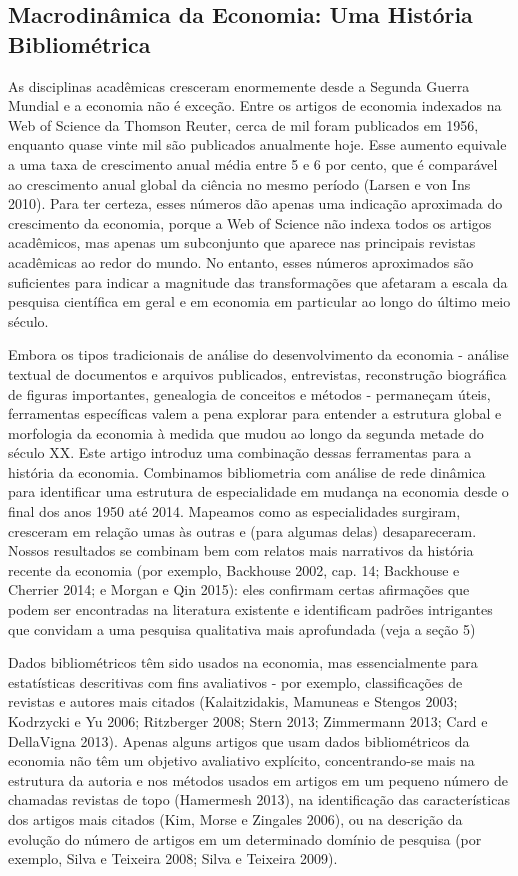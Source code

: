 \documentclass[12pt]{article}
\begin{document}
\subsection{\textbf{Macrodinâmica da Economia: Uma História Bibliométrica}}
As disciplinas acadêmicas cresceram enormemente desde a Segunda Guerra Mundial e a economia não é exceção. Entre os artigos de economia indexados na Web of Science da Thomson Reuter, cerca de mil foram publicados em 1956, enquanto quase vinte mil são publicados anualmente hoje. Esse aumento equivale a uma taxa de crescimento anual média entre 5 e 6 por cento, que é comparável ao crescimento anual global da ciência no mesmo período (Larsen e von Ins 2010). Para ter certeza, esses números dão apenas uma indicação aproximada do crescimento da economia, porque a Web of Science não indexa todos os artigos acadêmicos, mas apenas um subconjunto que aparece nas principais revistas acadêmicas ao redor do mundo. No entanto, esses números aproximados são suficientes para indicar a magnitude das transformações que afetaram a escala da pesquisa científica em geral e em economia em particular ao longo do último meio século.

Embora os tipos tradicionais de análise do desenvolvimento da economia - análise textual de documentos e arquivos publicados, entrevistas, reconstrução biográfica de figuras importantes, genealogia de conceitos e métodos - permaneçam úteis, ferramentas específicas valem a pena explorar para entender a estrutura global e morfologia da economia à medida que mudou ao longo da segunda metade do século XX. Este artigo introduz uma combinação dessas ferramentas para a história da economia. Combinamos bibliometria com análise de rede dinâmica para identificar uma estrutura de especialidade em mudança na economia desde o final dos anos 1950 até 2014. Mapeamos como as especialidades surgiram, cresceram em relação umas às outras e (para algumas delas) desapareceram. Nossos resultados se combinam bem com relatos mais narrativos da história recente da economia (por exemplo, Backhouse 2002, cap. 14; Backhouse e Cherrier 2014; e Morgan e Qin 2015): eles confirmam certas afirmações que podem ser encontradas na literatura existente e identificam padrões intrigantes que convidam a uma pesquisa qualitativa mais aprofundada (veja a seção 5)

Dados bibliométricos têm sido usados na economia, mas essencialmente para estatísticas descritivas com fins avaliativos - por exemplo, classificações de revistas e autores mais citados (Kalaitzidakis, Mamuneas e Stengos 2003; Kodrzycki e Yu 2006; Ritzberger 2008; Stern 2013; Zimmermann 2013; Card e DellaVigna 2013). Apenas alguns artigos que usam dados bibliométricos da economia não têm um objetivo avaliativo explícito, concentrando-se mais na estrutura da autoria e nos métodos usados em artigos em um pequeno número de chamadas revistas de topo (Hamermesh 2013), na identificação das características dos artigos mais citados (Kim, Morse e Zingales 2006), ou na descrição da evolução do número de artigos em um determinado domínio de pesquisa (por exemplo, Silva e Teixeira 2008; Silva e Teixeira 2009).
\end{document}

